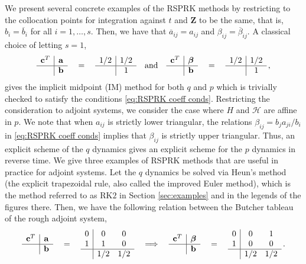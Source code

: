 \documentclass[11pt, oneside]{article}
\numberwithin{equation}{section}
\theoremstyle{definition}
\newcommand{\ob}[1]{\overline{#1}}
\newcommand{\mc}[1]{\mathcal{#1}}
\newcommand{\bs}[1]{\boldsymbol{#1}}
\newcommand{\mcal}[1]{\mc{#1}}
\begin{document}
We present several concrete examples of the RSPRK methods by restricting to the collocation points for integration against $t$ and $\mathbf{Z}$ to be the same, that is, $b_i = \ob{b}_i$ for all $i = 1,\ldots, s$. Then, we have that $\ob{a}_{ij} = a_{ij}$ and $\beta_{ij} = \ob{\beta}_{ij}$. A classical choice of letting $s = 1$,
\begin{align}
\begin{array}{c|c}
\mathbf{c}^T  & \mathbf{a} \\
\hline
  & \mathbf{b}    
\end{array} 
\quad  =  \quad 
\begin{array}{c|c}
1/2  & 1/2     \\
\hline
  & 1    
\end{array}\quad  \text{and} \quad 
\begin{array}{c|c}
\mathbf{c}^T  & \bs{\beta} \\
\hline
  & \mathbf{b}    
\end{array} 
\quad  =  \quad 
\begin{array}{c|c}
1/2  & 1/2     \\
\hline
  & 1  
\end{array}\,,\label{eq:RPSPRK IM}
\end{align}
gives the implicit midpoint (IM) method for both $q$ and $p$ which is trivially checked to satisfy the conditions \eqref{eq:RSPRK coeff conds}. Restricting the consideration to adjoint systems, we consider the case where $H$ and $\mcal{H}$ are affine in $p$. We note that when $a_{ij}$ is strictly lower triangular, the relations $\beta_{ij} = b_ja_{ji}/b_i$ in \eqref{eq:RSPRK coeff conds} implies that $\beta_{ij}$ is strictly upper triangular. Thus, an explicit scheme of the $q$ dynamics gives an explicit scheme for the $p$ dynamics in reverse time. We give three examples of RSPRK methods that are useful in practice for adjoint systems. Let the $q$ dynamics be solved via Heun's method (the explicit trapezoidal rule, also called the improved Euler method), which is the method referred to as RK$2$ in Section \ref{sec:examples} and in the legends of the figures there. Then, we have the following relation between the Butcher tableau of the rough adjoint system,
\begin{align}
\begin{array}{c|c}
\mathbf{c}^T  & \mathbf{a} \\
\hline
  & \mathbf{b}    
\end{array} 
\quad  =  \quad 
\begin{array}{c|cc}
0  & 0  & 0  \\
1  & 1  & 0   \\
\hline
  & 1/2 &1/2   
\end{array}\quad  \Longrightarrow \quad 
\begin{array}{c|c}
\mathbf{c}^T  & \bs{\beta} \\
\hline
  & \mathbf{b}    
\end{array} 
\quad  =  \quad 
\begin{array}{c|cc}
0  & 0  & 1  \\
1  & 0  & 0   \\
\hline
  & 1/2 &1/2   
\end{array}\,.\label{eq:RPSPRK rk2}
\end{align}
\end{document}
